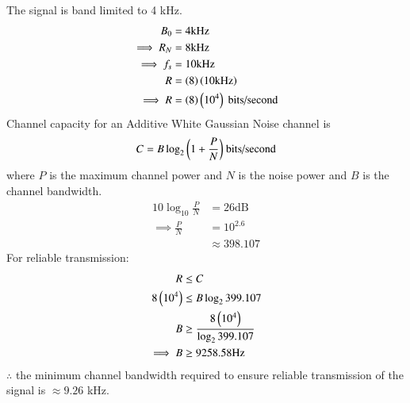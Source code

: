 \documentclass[journal,12pt,twocolumn]{IEEEtran}
\theoremstyle{remark}
\begin{document}
The signal is band limited to 4 kHz.
\begin{align}
B_0 &= 4\text{kHz} \\
\implies R_N &= 8\text{kHz} \\
\implies f_s &= 10\text{kHz} \\
R &= \left(8\right)\left(10\text{kHz}\right) \\
\implies R &= \left(8\right)\left(10^4\right)\text{ bits/second}
\end{align}
Channel capacity for an Additive White Gaussian Noise channel is
\begin{align}
C = B\log_2{\left(1 + \frac{P}{N}\right)}\text{ bits/second}
\end{align}
where $P$ is the maximum channel power and $N$ is the noise power and $B$ is the channel bandwidth.
\begin{align}
10\log_{10}{\frac{P}{N}} &= 26\text{dB} \\
\implies \frac{P}{N} &= 10^{2.6} \\
&\approx 398.107
\end{align}
For reliable transmission:
\begin{align}
R &\le C \\
8\left(10^4\right) &\le B\log_2{399.107} \\
B &\ge \frac{8\left(10^4\right)}{\log_2{399.107}} \\
\implies B &\ge 9258.58\text{Hz}
\end{align}
$\therefore$ the minimum channel bandwidth required to ensure reliable transmission of the signal is $\approx9.26$ kHz.
\end{document}
